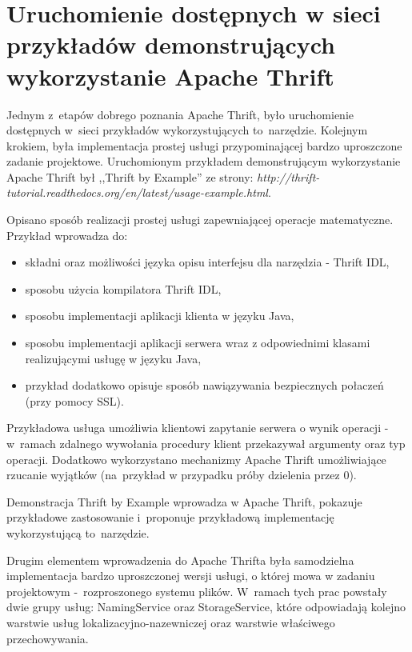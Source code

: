 \chapter[Uruchomienie dostępnych w sieci przykładów demonstrujących
wykorzystanie Apache Thrift][Uruchomienie dostępnych w sieci przykładów
demonstrujących wykorzystanie Apache Thrift]{Uruchomienie dostępnych w sieci
przykładów demonstrujących wykorzystanie Apache Thrift}
Jednym z~etapów dobrego poznania Apache Thrift, było uruchomienie dostępnych
w~sieci przykładów wykorzystujących to~narzędzie. Kolejnym krokiem, była
implementacja prostej usługi przypominającej bardzo uproszczone zadanie
projektowe. Uruchomionym przykładem demonstrującym wykorzystanie Apache Thrift
był ,,Thrift by Example'' ze strony:
\emph{http://thrift-tutorial.readthedocs.org/en/latest/usage-example.html}.

\vspace{5mm}
Opisano sposób realizacji prostej usługi zapewniającej operacje matematyczne.
Przykład wprowadza do:
\begin{itemize}
  \item składni oraz możliwości języka opisu interfejsu dla narzędzia - Thrift
  IDL,
  \item sposobu użycia kompilatora Thrift IDL,
  \item sposobu implementacji aplikacji klienta w języku Java,
  \item sposobu implementacji aplikacji serwera wraz z odpowiednimi klasami
  realizującymi usługę w języku Java,
  \item przykład dodatkowo opisuje sposób nawiązywania bezpiecznych połaczeń
  (przy pomocy SSL).
\end{itemize}

\vspace{5mm}
Przykładowa usługa umożliwia klientowi zapytanie serwera o wynik operacji -
w~ramach zdalnego wywołania procedury klient przekazywał argumenty oraz typ
operacji. Dodatkowo wykorzystano mechanizmy Apache Thrift umożliwiające
rzucanie wyjątków (na~przykład w przypadku próby dzielenia przez 0).

\vspace{5mm}
Demonstracja Thrift by Example wprowadza w Apache Thrift, pokazuje przykładowe
zastosowanie i~proponuje przykładową implementację wykorzystującą to~narzędzie.

\vspace{5mm}
Drugim elementem wprowadzenia do Apache Thrifta była samodzielna implementacja
bardzo uproszczonej wersji usługi, o której mowa w zadaniu projektowym
-~rozproszonego systemu plików. W~ramach tych prac powstały dwie grupy usług:
NamingService oraz StorageService, które odpowiadają kolejno warstwie usług
lokalizacyjno-nazewniczej oraz warstwie właściwego przechowywania.

